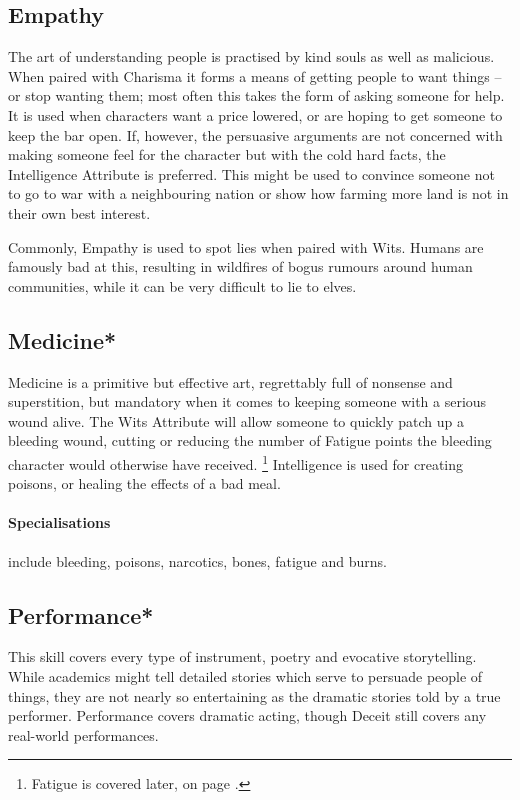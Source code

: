 \begin{multicols}{2}
\subsection{Empathy}

The art of understanding people is practised by kind souls as well as malicious.
When paired with Charisma it forms a means of getting people to want things -- or stop wanting them; most often this takes the form of asking someone for help.
It is used when characters want a price lowered, or are hoping to get someone to keep the bar open.
If, however, the persuasive arguments are not concerned with making someone feel for the character but with the cold hard facts, the Intelligence Attribute is preferred.
This might be used to convince someone not to go to war with a neighbouring nation or show how farming more land is not in their own best interest.

Commonly, Empathy is used to spot lies when paired with Wits. Humans are famously bad at this, resulting in wildfires of bogus rumours around human communities, while it can be very difficult to lie to elves.

\subsection{Medicine*}

Medicine is a primitive but effective art, regrettably full of nonsense and superstition, but mandatory when it comes to keeping someone with a serious wound alive.
The Wits Attribute will allow someone to quickly patch up a bleeding wound, cutting or reducing the number of Fatigue points the bleeding character would otherwise have received.%
\footnote{Fatigue is covered later, on page \pageref{fatigue}.}
Intelligence is used for creating poisons, or healing the effects of a bad meal.

\paragraph{Specialisations} include bleeding, poisons, narcotics, bones, fatigue and burns.

\subsection{Performance*}

This skill covers every type of instrument, poetry and evocative storytelling. While academics might tell detailed stories which serve to persuade people of things, they are not nearly so entertaining as the dramatic stories told by a true performer. Performance covers dramatic acting, though Deceit still covers any real-world performances.


\end{multicols}
